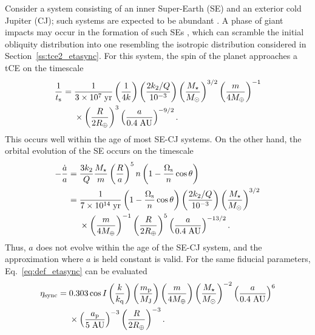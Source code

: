 \documentclass[
        fleqn,
        usenatbib,
    ]{mnras}
\newcommand*{\p}[1]{\left(#1\right)}
\begin{document}
Consider a system consisting of an inner Super-Earth (SE) and an exterior cold
Jupiter (CJ); such systems are expected to be abundant \citep{zhu2018super}. A
phase of giant impacts may occur in the formation of such SEs
\citep{inamdar2015formation, izidoro2017breaking}, which can scramble the
initial obliquity distribution into one resembling the isotropic distribution
considered in Section~\ref{ss:tce2_etasync}. For this system, the spin of the
planet approaches a tCE on the timescale
\begin{align}
    \frac{1}{t_{\rm s}} ={}& \frac{1}{3 \times 10^7\;\mathrm{yr}}
            \p{\frac{1}{4k}}
            \p{\frac{2k_2/Q}{10^{-3}}}
            \p{\frac{M_\star}{M_{\odot}}}^{3/2}
            \p{\frac{m}{4M_{\oplus}}}^{-1}\nonumber\\
        &\times \p{\frac{R}{2R_{\oplus}}}^3
            \p{\frac{a}{0.4\;\mathrm{AU}}}^{-9/2}.
            \label{eq:sehj_ts}
\end{align}
This occurs well within the age of most SE-CJ systems. On the other hand,
the orbital evolution of the SE occurs on the timescale \citep{lai2012}
\begin{align}
    -\frac{\dot{a}}{a} ={}& \frac{3k_2}{Q}\frac{M_\star}{m}
            \p{\frac{R}{a}}^5n \p{1 - \frac{\Omega_{\rm s}}{n}\cos \theta}\nonumber\\
        ={}& \frac{1}{7 \times 10^{14}\;\mathrm{yr}}
            \p{1 - \frac{\Omega_{\rm s}}{n}\cos \theta}
            \p{\frac{2k_2/Q}{10^{-3}}}
            \p{\frac{M_\star}{M_{\odot}}}^{3/2}\nonumber\\
        &\times \p{\frac{m}{4M_{\oplus}}}^{-1}
            \p{\frac{R}{2R_{\oplus}}}^5
            \p{\frac{a}{0.4\;\mathrm{AU}}}^{-13/2}.\label{eq:sehj_adot}
\end{align}
Thus, $a$ does not evolve within the age of the SE-CJ system, and the
approximation where $a$ is held constant is valid. For the same fiducial
parameters, Eq.~\eqref{eq:def_etasync} can be evaluated
\begin{align}
    \eta_{\rm sync} ={}& 0.303 \cos I
            \p{\frac{k}{k_{\rm q}}}
            \p{\frac{m_{\rm p}}{M_{\rm J}}}
            \p{\frac{m}{4M_{\oplus}}}
            \p{\frac{M_\star}{M_{\odot}}}^{-2}
            \p{\frac{a}{0.4\;\mathrm{AU}}}^{6}\nonumber\\
        &\times \p{\frac{a_{\rm p}}{5\;\mathrm{AU}}}^{-3}
            \p{\frac{R}{2R_{\oplus}}}^{-3}.\label{eq:sehj_etasync}
\end{align}
\end{document}
